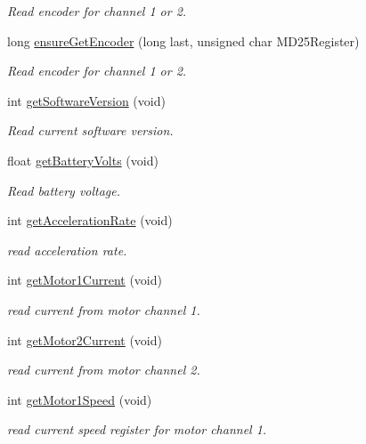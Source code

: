 \begin{DoxyCompactItemize}
\begin{DoxyCompactList}\small\item\em Read encoder for channel 1 or 2. \end{DoxyCompactList}\item 
long \hyperlink{classMd25_a7ae9bff45c48099fe56746360135a660}{ensure\+Get\+Encoder} (long last, unsigned char M\+D25\+Register)
\begin{DoxyCompactList}\small\item\em Read encoder for channel 1 or 2. \end{DoxyCompactList}\item 
int \hyperlink{classMd25_ada7700354c1d30fa2463b364ab705247}{get\+Software\+Version} (void)
\begin{DoxyCompactList}\small\item\em Read current software version. \end{DoxyCompactList}\item 
float \hyperlink{classMd25_aab64f06aef0d5e0214772c519eb6a2e8}{get\+Battery\+Volts} (void)
\begin{DoxyCompactList}\small\item\em Read battery voltage. \end{DoxyCompactList}\item 
int \hyperlink{classMd25_a50bd56e7105bb66c2392fc6f6708f0d1}{get\+Acceleration\+Rate} (void)
\begin{DoxyCompactList}\small\item\em read acceleration rate. \end{DoxyCompactList}\item 
int \hyperlink{classMd25_a1535d2b845905df746a4e1e3620d7cfb}{get\+Motor1\+Current} (void)
\begin{DoxyCompactList}\small\item\em read current from motor channel 1. \end{DoxyCompactList}\item 
int \hyperlink{classMd25_a7c7811080004fe8c066b4fd50260e252}{get\+Motor2\+Current} (void)
\begin{DoxyCompactList}\small\item\em read current from motor channel 2. \end{DoxyCompactList}\item 
int \hyperlink{classMd25_a630e4aebcbee4178b5ce5a7044f8f2ce}{get\+Motor1\+Speed} (void)
\begin{DoxyCompactList}\small\item\em read current speed register for motor channel 1. \end{DoxyCompactList}\item 

\end{DoxyCompactItemize}
